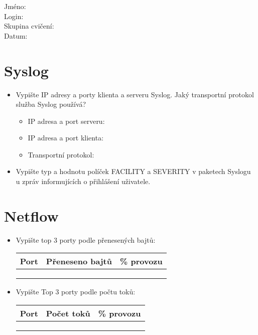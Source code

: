 Jméno:\\
Login:\\
Skupina cvičení:\\
Datum:\\

\section{Syslog}

\begin{itemize}
    \item Vypište IP adresy a porty klienta a serveru Syslog. Jaký transportní protokol služba Syslog používá?
    \begin{itemize}
        \item IP adresa a port serveru:
        \item IP adresa a port klienta:
        \item Transportní protokol: 
    \end{itemize}
    \item Vypište typ a hodnotu políček FACILITY a SEVERITY v paketech Syslogu u zpráv informujících o přihlášení uživatele.
    \vspace{2cm}
\end{itemize}

\section{Netflow}

\begin{itemize} 
\item Vypište top 3 porty podle přenesených bajtů: 

\begin{tabular}{|p{2cm}|p{3cm}|p{3cm}|}
\hline
Port  & Přeneseno bajtů  & \% provozu \\ \hline
      &                  &        \\   \hline
      &                  &         \\  \hline
      &                  &        \\   \hline
\end{tabular}

\item Vypište Top 3 porty podle počtu toků: 

\begin{tabular}{|p{2cm}|p{3cm}|p{3cm}|}
\hline
Port  & Počet toků  & \% provozu \\ \hline
      &                  &        \\   \hline
      &                  &         \\  \hline
      &                  &         \\  \hline
\end{tabular}
\end{itemize}

